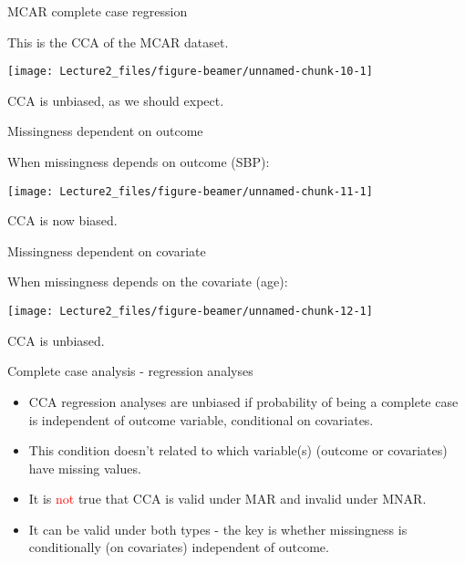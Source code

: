 \documentclass[ignorenonframetext,]{beamer}
\providecommand{\tightlist}{%
  \setlength{\itemsep}{0pt}\setlength{\parskip}{0pt}}
\begin{document}
\begin{frame}{MCAR complete case regression}
\protect\hypertarget{mcar-complete-case-regression}{}

This is the CCA of the MCAR dataset.

\begin{center}\texttt{[image: Lecture2\_files/figure-beamer/unnamed-chunk-10-1]} \end{center}

CCA is unbiased, as we should expect.

\end{frame}

\begin{frame}{Missingness dependent on outcome}
\protect\hypertarget{missingness-dependent-on-outcome}{}

When missingness depends on outcome (SBP):

\begin{center}\texttt{[image: Lecture2\_files/figure-beamer/unnamed-chunk-11-1]} \end{center}

CCA is now biased.

\end{frame}

\begin{frame}{Missingness dependent on covariate}
\protect\hypertarget{missingness-dependent-on-covariate}{}

When missingness depends on the covariate (age):

\begin{center}\texttt{[image: Lecture2\_files/figure-beamer/unnamed-chunk-12-1]} \end{center}

CCA is unbiased.

\end{frame}

\begin{frame}{Complete case analysis - regression analyses}
\protect\hypertarget{complete-case-analysis---regression-analyses-1}{}

\begin{itemize}
\tightlist
\item
  CCA regression analyses are unbiased if probability of being a
  complete case is independent of outcome variable, conditional on
  covariates.
\item
  This condition doesn't related to which variable(s) (outcome or
  covariates) have missing values.
\item
  It is \textcolor{red}{not} true that CCA is valid under MAR and
  invalid under MNAR.
\item
  It can be valid under both types - the key is whether missingness is
  conditionally (on covariates) independent of outcome.
\end{itemize}

\end{frame}
\end{document}
